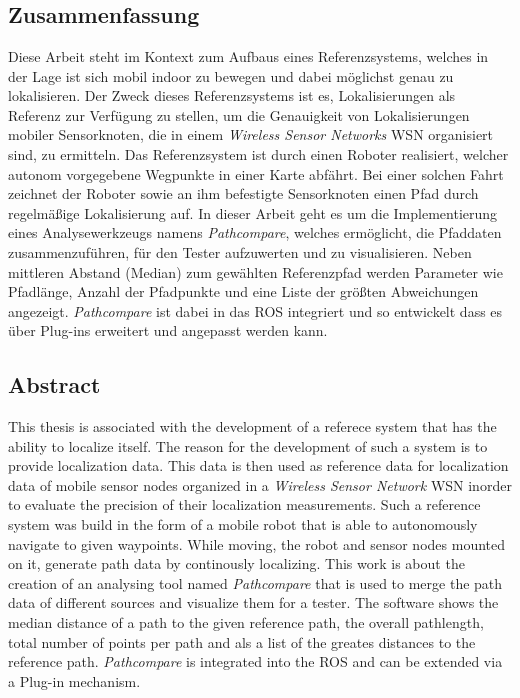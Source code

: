 \chapter*{\abstractname}
\section*{Zusammenfassung} Diese Arbeit steht im Kontext zum Aufbaus eines
Referenzsystems, welches in der Lage ist sich mobil indoor zu bewegen und dabei
möglichst genau zu lokalisieren.  Der Zweck dieses Referenzsystems ist es,
Lokalisierungen als Referenz zur Verfügung zu stellen, um die Genauigkeit von
Lokalisierungen mobiler Sensorknoten, die in einem \textit{Wireless Sensor
Networks} \gls{WSN} organisiert sind, zu ermitteln. Das Referenzsystem ist
durch einen Roboter realisiert, welcher autonom vorgegebene Wegpunkte in einer
Karte abfährt. Bei einer solchen Fahrt zeichnet der Roboter sowie an ihm
befestigte Sensorknoten einen Pfad durch regelmäßige Lokalisierung auf. In
dieser Arbeit geht es um die Implementierung eines Analysewerkzeugs namens
\textit{Pathcompare}, welches ermöglicht, die Pfaddaten zusammenzuführen, für
den Tester aufzuwerten und zu visualisieren. Neben mittleren Abstand (Median)
zum gewählten Referenzpfad werden Parameter wie Pfadlänge, Anzahl der
Pfadpunkte und eine Liste der größten Abweichungen angezeigt.
\textit{Pathcompare} ist dabei in das \gls{ROS} integriert und so entwickelt
dass es über Plug-ins erweitert und angepasst werden kann. 


\section*{Abstract} This thesis is associated with the development of a
referece system that has the ability to localize itself. The reason for the
development of such a system is to provide localization data. This data is then
used as reference data for localization data of mobile sensor nodes organized
in a \textit{Wireless Sensor Network} \gls{WSN} inorder to evaluate the
precision of their localization measurements. Such a reference system was build
in the form of a mobile robot that is able to autonomously navigate to given
waypoints.  While moving, the robot and sensor nodes mounted on it, generate
path data by continously localizing. This work is about the creation of an
analysing tool named \textit{Pathcompare} that is used to merge the path data
of different sources and visualize them for a tester. The software shows the
median distance of a path to the given reference path, the overall pathlength,
total number of points per path and als a list of the greates distances to the
reference path. \textit{Pathcompare} is integrated into the \gls{ROS} and can
be extended via a Plug-in mechanism.

